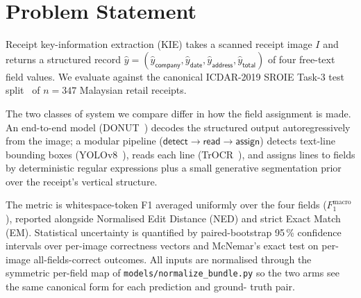 \section{Problem Statement}
\label{sec:problem}

Receipt key-information extraction (KIE) takes a scanned receipt
image $I$ and returns a structured record
$\hat{y} = (\hat{y}_{\textsf{company}}, \hat{y}_{\textsf{date}},
\hat{y}_{\textsf{address}}, \hat{y}_{\textsf{total}})$ of four
free-text field values.  We evaluate against the canonical
ICDAR-2019 SROIE Task-3 test split~\cite{huang2019icdar} of $n=347$
Malaysian retail receipts.

The two classes of system we compare differ in how the field
assignment is made.  An end-to-end model
(DONUT~\cite{kim2022donut}) decodes the structured output
autoregressively from the image; a modular pipeline
($\textsf{detect} \to \textsf{read} \to \textsf{assign}$) detects
text-line bounding boxes (YOLOv8~\cite{jocher2023yolov8}), reads each
line (TrOCR~\cite{li2023trocr}), and assigns lines to fields by
deterministic regular expressions plus a small generative segmentation
prior over the receipt's vertical structure.

The metric is whitespace-token F1 averaged uniformly over the four
fields ($F_1^{\text{macro}}$), reported alongside Normalised Edit
Distance (NED) and strict Exact Match (EM).  Statistical uncertainty
is quantified by paired-bootstrap 95\,\% confidence intervals over
per-image correctness vectors and McNemar's exact test on per-image
all-fields-correct outcomes.  All inputs are normalised through the
symmetric per-field map of \texttt{models/normalize\_bundle.py} so the
two arms see the same canonical form for each prediction and ground-
truth pair.
